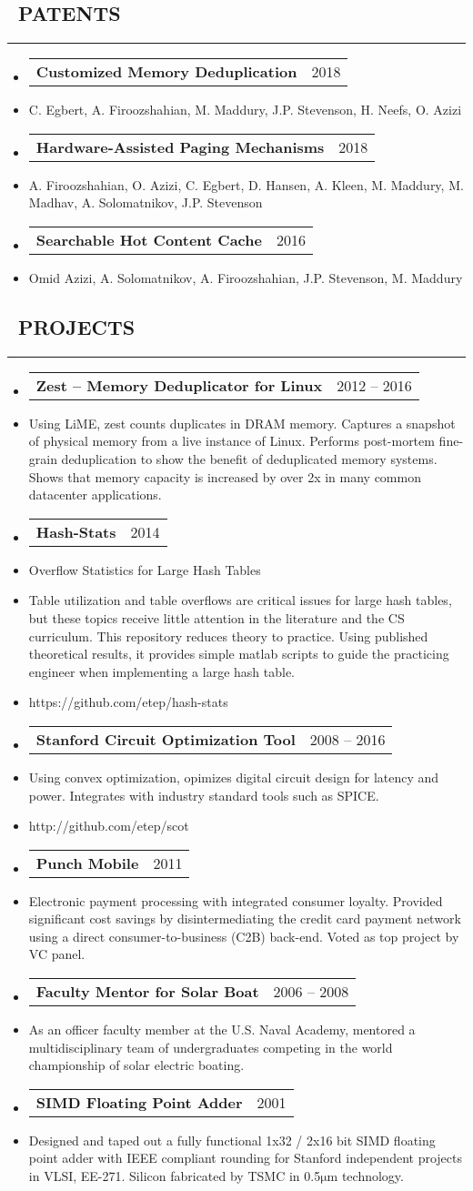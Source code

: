 \documentclass[10pt,letterpaper]{article}
\makeatletter
\newenvironment{resumesection}[1]
{%
    \subsection*{\ \textcolor{light-gray}{#1} }
    \vspace{-0.4em}
    \begin{samepage}
    \hrule
    \end{samepage}
    \vspace{+0.4em}
    \begin{itemize}[leftmargin=0.15cm]
        \parskip=0.1em
}%
{%
    \end{itemize}
}%
\newcommand{\myitem}[1] {
    \item[] \textcolor{dark-gray}{#1}
}
\newcommand{\headerbi}[2] {
    \item[] \begin{tabular*}{\linewidth}{l@{\extracolsep{\fill}}r}
    \textbf{#1} & #2 \\
    \end{tabular*}
}
\newcommand{\rminiw}{0.550}
\makeatother
\begin{document}
\begin{minipage}[t]{\rminiw\textwidth}
    \begin{resumesection}{PATENTS}
        \headerbi{Customized Memory Deduplication}{2018}
        \myitem{C. Egbert, A. Firoozshahian, M. Maddury, J.P. Stevenson, H. Neefs, O. Azizi}
        \headerbi{Hardware-Assisted Paging Mechanisms}{2018}
        \myitem{A. Firoozshahian, O. Azizi, C. Egbert, D. Hansen, A. Kleen, M. Maddury, M. Madhav, A. Solomatnikov, J.P. Stevenson}
        \headerbi{Searchable Hot Content Cache}{2016}
        \myitem{Omid Azizi, A. Solomatnikov, A. Firoozshahian, J.P. Stevenson, M. Maddury}
    \end{resumesection}
\begin{resumesection}{PROJECTS}
    \headerbi{Zest -- Memory Deduplicator for Linux}{2012 -- 2016}
    \myitem{
        Using LiME, zest counts duplicates in DRAM memory.
        Captures a snapshot of physical memory from a live instance of Linux.
        Performs post-mortem fine-grain deduplication to show the benefit of deduplicated memory systems.
        Shows that memory capacity is increased by over 2x in many common datacenter applications.
    }
    \headerbi{Hash-Stats}{2014}
    \myitem{Overflow Statistics for Large Hash Tables}
    \myitem{
        Table utilization and table overflows are critical issues for large hash tables,
        but these topics receive little attention in the literature and the CS curriculum.
        This repository reduces theory to practice.
        Using published theoretical results, it provides simple matlab scripts to guide the practicing engineer when implementing a large hash table.
    }
    \myitem{https://github.com/etep/hash-stats}
    \headerbi{Stanford Circuit Optimization Tool}{2008 -- 2016}
    \myitem{
        Using convex optimization, opimizes digital circuit design for latency and power.
        Integrates with industry standard tools such as SPICE.
    }
    \myitem{http://github.com/etep/scot}
    \headerbi{Punch Mobile}{2011}
    \myitem{
        Electronic payment processing with integrated consumer loyalty.
        Provided significant cost savings by disintermediating the credit card payment network using a direct consumer-to-business (C2B) back-end.
        Voted as top project by VC panel.
    }
    \headerbi{Faculty Mentor for Solar Boat}{2006 -- 2008}
    \myitem{
        As an officer faculty member at the U.S. Naval Academy,
        mentored a multidisciplinary team of undergraduates
        competing in the world championship of solar electric boating.
    }
    \headerbi{SIMD Floating Point Adder}{2001}
    \myitem{
        Designed and taped out a fully functional 1x32 / 2x16 bit
        SIMD floating point adder with IEEE compliant rounding
        for Stanford independent projects in VLSI, EE-271.
        Silicon fabricated by TSMC in 0.5$\mathrm{ \mu m}$ technology.
    }
\end{resumesection}
\end{minipage}
\end{document}
